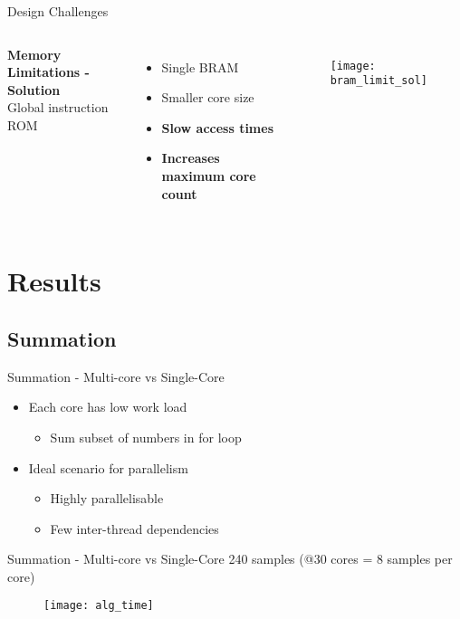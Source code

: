 \documentclass[aspectratio=169]{beamer}
\newcommand\pro{\item[$+$]}
\newcommand\con{\item[$-$]}
\begin{document}
\begin{frame}[fragile,t]{Design Challenges}
\begin{columns}
\textbf{Memory Limitations - Solution}\\
\vspace{0.5cm}
Global instruction ROM
\begin{itemize}
    \pro Single BRAM
    \pro Smaller core size
    \con \textbf{Slow access times}
    \pro \textbf{Increases maximum core count}
\end{itemize}
\begin{figure}
    \centering
    \texttt{[image: bram\_limit\_sol]}
\end{figure}
\end{columns}
\end{frame}

\section{Results}
\frame{\tableofcontents[currentsection, subsectionstyle=show/show/hide]}

\subsection{Summation}
\begin{frame}{Summation - Multi-core vs Single-Core}
\begin{itemize}\setlength{\itemsep 2em}
    \item Each core has low work load
        \begin{itemize}
            \item Sum subset of numbers in for loop
        \end{itemize}
    \item Ideal scenario for parallelism
    \begin{itemize}
        \item Highly parallelisable
        \item Few inter-thread dependencies
    \end{itemize}
\end{itemize}
\end{frame}

\begin{frame}{Summation - Multi-core vs Single-Core}
240 samples (@30 cores = 8 samples per core)
\begin{figure}
    \centering
    \texttt{[image: alg\_time]}
\end{figure}
\end{frame}
\end{document}
